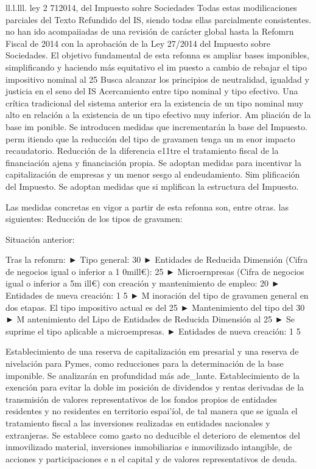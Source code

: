 \documentclass[10pt,a4paper]{article}
\begin{document}
ll.l.lll. ley 2 712014, del Impuesto sohre Sociedades
Todas estas modilicaciones parciales del Texto Refundido del IS, siendo todas ellas parcialmente consistentes. no han ido acompaiiadas de una revisión de carácter global hasta la Refomrn Fiscal de 2014 con la aprobación de la Ley 27/2014 del Impuesto sobre Sociedades. El objetivo fundamental de esta refonna es ampliar bases imponibles, simplificando y haciendo más equitativo el im puesto a cambio de rebajar el tipo impositivo nominal al 25%
Busca alcanzar los principios de neutralidad, igualdad y justicia en el seno del IS 
Acercamiento entre tipo nominal y tipo efectivo. Una crítica tradicional del sistema anterior era la existencia de un tipo nominal muy alto en relación a la existencia de un tipo efectivo muy inferior. 
Am pliación de la base im ponible. Se introducen medidas que incrementarán la base del Impuesto. perm itiendo que la reducción del tipo de gravamen tenga un m enor impacto recaudatorio. 
Reducción de la diferencia e11tre el tratamiento fiscal de la financiación ajena y financiación propia. Se adoptan medidas para incentivar la capitalización de empresas y un menor sesgo al endeudamiento. 
Sim plificación del Impuesto. Se adoptan medidas que si mplifican la estructura del Impuesto.

Las medidas concretas en vigor a partir de esta refonna son, entre otras. las siguientes: Reducción de los tipos de gravamen:

Situación anterior:

Tras la refomrn:
► Tipo general: 30%
► Entidades de Reducida Dimensión (Cifra de negocios igual o inferior a 1 0mill€): 25%
► Microernpresas (Cifra de negocios igual o inferior a 5m ill€) con creación y mantenimiento de empleo: 20%
► Entidades de nueva creación: 1 5%
► M inoración del tipo de gravamen general en dos etapas. El tipo impositivo actual es del 25%
► Mantenimiento del tipo del 30%
► M antenimiento del Lipo de Entidades de Reducida Dimensión al 25%
► Se suprime el tipo aplicable a microempresas.
► Entidades de nueva creación: 1 5%

Establecimiento de una reserva de capitalización em presarial y una reserva de nivelación para Pymes, como reducciones para la determinación de la base imponible. Se analizarán en profundidad más ade_lante. 
Establecimiento de la exención para evitar la doble im posición de dividendos y rentas derivadas de la transmisión de valores representativos de los fondos propios de entidades residentes y no residentes en territorio espai'íol, de tal manera que se iguala el tratamiento fiscal a las inversiones realizadas en entidades nacionales y extranjeras. 
Se establece como gasto no deducible el deterioro de elementos del inmovilizado material, inversiones inmobiliarias e inmovilizado intangible, de acciones y participaciones e n el capital y de valores representativos de deuda.
\end{document}
